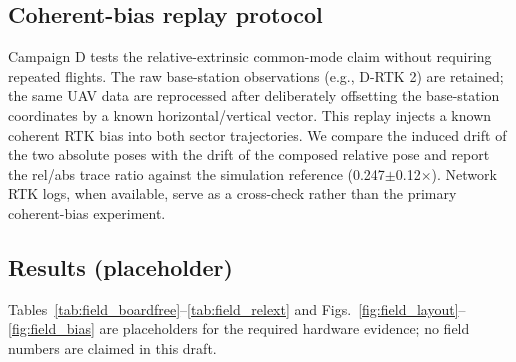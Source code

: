 \subsection{Coherent-bias replay protocol}
Campaign D tests the relative-extrinsic common-mode claim without requiring repeated
flights.
The raw base-station observations (e.g., D-RTK 2) are retained; the same UAV data are
reprocessed after deliberately offsetting the base-station coordinates by a known
horizontal/vertical vector.
This replay injects a known coherent RTK bias into both sector trajectories.
We compare the induced drift of the two absolute poses with the drift of the composed
relative pose and report the rel/abs trace ratio against the simulation reference
(0.247$\pm$0.12$\times$).
Network RTK logs, when available, serve as a cross-check rather than the primary
coherent-bias experiment.

\subsection{Results (placeholder)}
Tables~\ref{tab:field_boardfree}--\ref{tab:field_relext} and
Figs.~\ref{fig:field_layout}--\ref{fig:field_bias} are placeholders for the required
hardware evidence; no field numbers are claimed in this draft.

\begin{table}[!t]
  \centering
  \caption{Campaign A: field board-free accuracy vs.\ total-station sphere-anchor
  ground truth (placeholder; spheres are evaluation rulers only, not calibration
  inputs).}
  \label{tab:field_boardfree}
  \footnotesize
\end{table}

